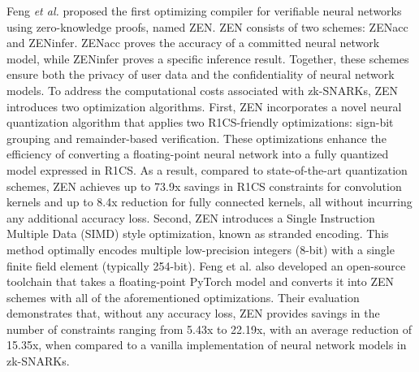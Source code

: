 \documentclass[journal]{IEEEtran}
\begin{document}
Feng \emph{et al.}  \cite{feng2021zen} proposed the first optimizing compiler for verifiable neural networks using zero-knowledge proofs, named ZEN. ZEN consists of two schemes: ZENacc and ZENinfer. ZENacc proves the accuracy of a committed neural network model, while ZENinfer proves a specific inference result. Together, these schemes ensure both the privacy of user data and the confidentiality of neural network models. To address the computational costs associated with zk-SNARKs, ZEN introduces two optimization algorithms. First, ZEN incorporates a novel neural quantization algorithm that applies two R1CS-friendly optimizations: sign-bit grouping and remainder-based verification. These optimizations enhance the efficiency of converting a floating-point neural network into a fully quantized model expressed in R1CS. As a result, compared to state-of-the-art quantization schemes, ZEN achieves up to 73.9x savings in R1CS constraints for convolution kernels and up to 8.4x reduction for fully connected kernels, all without incurring any additional accuracy loss. Second, ZEN introduces a Single Instruction Multiple Data (SIMD) style optimization, known as stranded encoding. This method optimally encodes multiple low-precision integers (8-bit) with a single finite field element (typically 254-bit). Feng et al. also developed an open-source toolchain that takes a floating-point PyTorch model and converts it into ZEN schemes with all of the aforementioned optimizations. Their evaluation demonstrates that, without any accuracy loss, ZEN provides savings in the number of constraints ranging from 5.43x to 22.19x, with an average reduction of 15.35x, when compared to a vanilla implementation of neural network models in zk-SNARKs.


\end{document}
